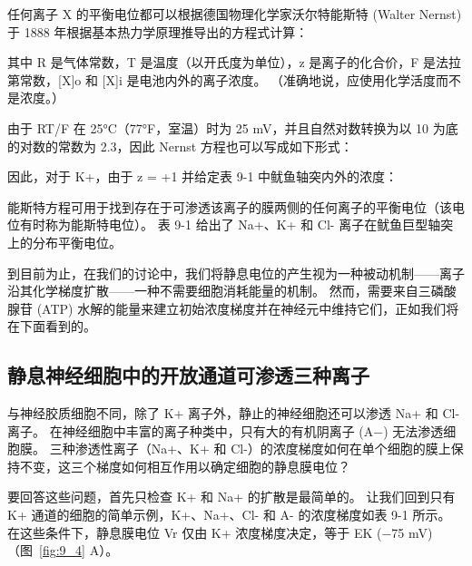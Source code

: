 任何离子 X 的平衡电位都可以根据德国物理化学家沃尔特能斯特 (Walter Nernst) 于 1888 年根据基本热力学原理推导出的方程式计算：


其中 R 是气体常数，T 是温度（以开氏度为单位），z 是离子的化合价，F 是法拉第常数，[X]o 和 [X]i 是电池内外的离子浓度。
（准确地说，应使用化学活度而不是浓度。）


由于 RT/F 在 25°C（77°F，室温）时为 25 mV，并且自然对数转换为以 10 为底的对数的常数为 2.3，因此 Nernst 方程也可以写成如下形式：


因此，对于 K+，由于 z = +1 并给定表 9-1 中鱿鱼轴突内外的浓度：


能斯特方程可用于找到存在于可渗透该离子的膜两侧的任何离子的平衡电位（该电位有时称为能斯特电位）。
表 9-1 给出了 Na+、K+ 和 Cl- 离子在鱿鱼巨型轴突上的分布平衡电位。


到目前为止，在我们的讨论中，我们将静息电位的产生视为一种被动机制——离子沿其化学梯度扩散——一种不需要细胞消耗能量的机制。
然而，需要来自三磷酸腺苷 (ATP) 水解的能量来建立初始浓度梯度并在神经元中维持它们，正如我们将在下面看到的。



\subsection{静息神经细胞中的开放通道可渗透三种离子}

与神经胶质细胞不同，除了 K+ 离子外，静止的神经细胞还可以渗透 Na+ 和 Cl- 离子。
在神经细胞中丰富的离子种类中，只有大的有机阴离子 (A−) 无法渗透细胞膜。
三种渗透性离子（Na+、K+ 和 Cl-）的浓度梯度如何在单个细胞的膜上保持不变，这三个梯度如何相互作用以确定细胞的静息膜电位？


要回答这些问题，首先只检查 K+ 和 Na+ 的扩散是最简单的。
让我们回到只有 K+ 通道的细胞的简单示例，K+、Na+、Cl- 和 A- 的浓度梯度如表 9-1 所示。
在这些条件下，静息膜电位 Vr 仅由 K+ 浓度梯度决定，等于 EK (−75 mV)（图~\ref{fig:9_4} A）。


